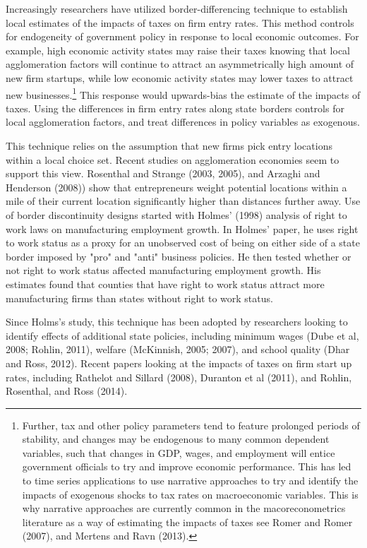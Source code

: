 Increasingly researchers have utilized border-differencing technique to establish local estimates of the impacts of taxes on firm entry rates. This method controls for endogeneity of government policy in response to local economic outcomes. For example, high economic activity states may raise their taxes knowing that local agglomeration factors will continue to attract an asymmetrically high amount of new firm startups, while low economic activity states may lower taxes to attract new businesses.\footnote{Further, tax and other policy parameters tend to feature prolonged periods of stability, and changes may be endogenous to many common dependent variables, such that changes in GDP, wages, and employment will entice government officials to try and improve economic performance. This has led to time series applications to use narrative approaches to try and identify the impacts of exogenous shocks to tax rates on macroeconomic variables. This is why narrative approaches are currently common in the macoreconometrics literature as a way of estimating the impacts of taxes see Romer and Romer (2007), and Mertens and Ravn (2013).} This response would upwards-bias the estimate of the impacts of taxes. Using the differences in firm entry rates along state borders controls for local agglomeration factors, and treat differences in policy variables as exogenous.

This technique relies on the assumption that new firms pick entry locations within a local choice set. Recent studies on agglomeration economies seem to support this view.  Rosenthal and Strange (2003, 2005), and Arzaghi and Henderson (2008)) show that entrepreneurs weight potential locations within a mile of their current location significantly higher than distances further away. Use of border discontinuity designs started with Holmes’ (1998) analysis of right to work laws on manufacturing employment growth. In Holmes' paper, he uses right to work status as a proxy for an unobserved cost of being on either side of a state border imposed by "pro" and "anti" business policies. He then tested whether or not right to work status affected manufacturing employment growth. His estimates found that counties that have right to work status attract more manufacturing firms than states without right to work status.

Since Holms's study, this technique has been adopted by researchers looking to identify effects of additional state policies, including minimum wages (Dube et al, 2008; Rohlin, 2011), welfare (McKinnish, 2005; 2007), and school quality (Dhar and Ross, 2012). Recent papers looking at the impacts of taxes on firm start up rates, including Rathelot and Sillard (2008), Duranton et al (2011), and Rohlin, Rosenthal, and Ross (2014). 

